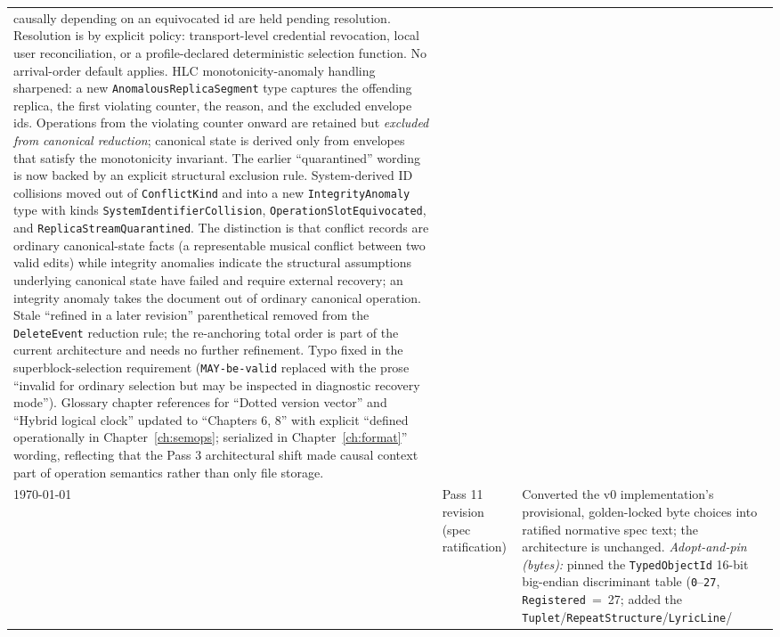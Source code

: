 \documentclass[11pt,letterpaper]{report}
\newcounter{requirement}[chapter]
\begin{document}
\begin{longtable}{p{2cm} p{2.5cm} p{9cm}}
  causally depending on an equivocated id are held pending
  resolution. Resolution is by explicit policy: transport-level
  credential revocation, local user reconciliation, or a
  profile-declared deterministic selection function. No
  arrival-order default applies. HLC monotonicity-anomaly
  handling sharpened: a new \texttt{AnomalousReplicaSegment}
  type captures the offending replica, the first violating
  counter, the reason, and the excluded envelope ids. Operations
  from the violating counter onward are retained but
  \emph{excluded from canonical reduction}; canonical state is
  derived only from envelopes that satisfy the monotonicity
  invariant. The earlier ``quarantined'' wording is now backed
  by an explicit structural exclusion rule. System-derived ID
  collisions moved out of \texttt{ConflictKind} and into a new
  \texttt{IntegrityAnomaly} type with kinds
  \texttt{SystemIdentifierCollision},
  \texttt{OperationSlotEquivocated}, and
  \texttt{ReplicaStreamQuarantined}. The distinction is that
  conflict records are ordinary canonical-state facts (a
  representable musical conflict between two valid edits) while
  integrity anomalies indicate the structural assumptions
  underlying canonical state have failed and require external
  recovery; an integrity anomaly takes the document out of
  ordinary canonical operation. Stale ``refined in a later
  revision'' parenthetical removed from the \texttt{DeleteEvent}
  reduction rule; the re-anchoring total order is part of the
  current architecture and needs no further refinement. Typo
  fixed in the superblock-selection requirement
  (\texttt{MAY{}-be-valid} replaced with the prose ``invalid for
  ordinary selection but may be inspected in diagnostic recovery
  mode''). Glossary chapter references for ``Dotted version
  vector'' and ``Hybrid logical clock'' updated to ``Chapters
  6, 8'' with explicit ``defined operationally in
  Chapter~\ref{ch:semops}; serialized in
  Chapter~\ref{ch:format}'' wording, reflecting that the
  Pass 3 architectural shift made causal context part of
  operation semantics rather than only file storage. \\
  \today & Pass 11 revision (spec ratification) &
  Converted the v0 implementation's provisional, golden-locked byte
  choices into ratified normative spec text; the architecture is
  unchanged. \emph{Adopt-and-pin (bytes):} pinned the
  \texttt{TypedObjectId} 16-bit big-endian discriminant table
  (\texttt{0}--\texttt{27}, \texttt{Registered}~=~27; added the
  \texttt{Tuplet}/\texttt{RepeatStructure}/\texttt{LyricLine}/%

\end{longtable}
\end{document}
